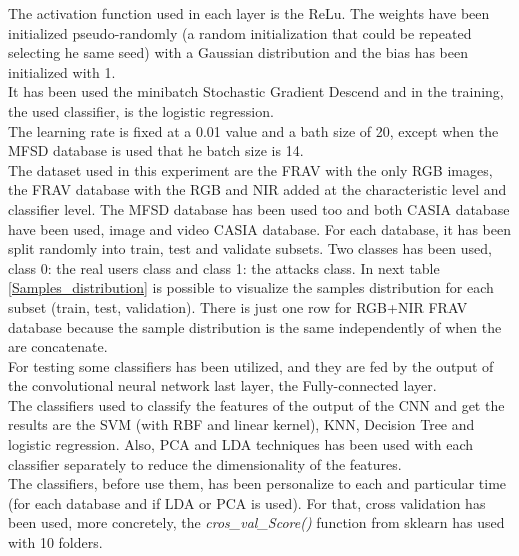 The activation function used in each layer is the ReLu. The weights have been initialized pseudo-randomly (a random initialization that could be repeated selecting he same seed) with a Gaussian distribution and the bias has been initialized with 1.\\

It has been used the minibatch Stochastic Gradient Descend and in the training, the used classifier, is the logistic regression.\\

The learning rate is fixed at a 0.01 value and a bath size of 20, except when the MFSD database is used that he batch size is 14.\\

The dataset used in this experiment are the FRAV with the only RGB images, the FRAV database with the RGB and NIR added at the characteristic level  and  classifier level. The MFSD database has been used too and both CASIA database have been used, image and video CASIA database. For each database, it has been split randomly into train, test and validate subsets. Two classes has been used, class 0: the real users class and class 1: the attacks class. In next table \ref{Samples_distribution} is possible to visualize the samples distribution for each subset (train, test, validation). There is just one row for RGB+NIR FRAV database because the sample distribution is the same independently of when the are concatenate.\\




For testing some classifiers has been utilized, and they are fed by the output of the convolutional neural network last layer, the Fully-connected layer.\\

The classifiers used to classify the features of the output of the CNN and get the results are the SVM (with RBF and linear kernel), KNN, Decision Tree and logistic regression. Also, PCA and LDA techniques has been used with each classifier separately to reduce the dimensionality of the features.\\

The classifiers, before use them, has been personalize to each and particular time (for each database and if LDA or PCA is used). For that, cross validation has been used, more concretely, the \textit{cros\_val\_Score()} function from sklearn has used with 10 folders.\\

